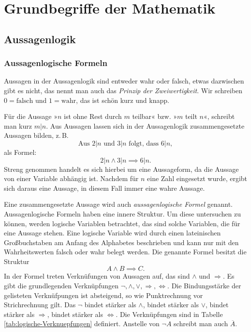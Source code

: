 
\chapter{Grundbegriffe der Mathematik}

\section{Aussagenlogik}

\subsection{Aussagenlogische Formeln}

Aussagen in der Aussagenlogik sind entweder wahr oder falsch,
etwas dazwischen gibt es nicht, das nennt man auch das \emph{Prinzip
der Zweiwertigkeit}.
Wir schreiben $0=\text{falsch}$ und $1=\text{wahr}$, das ist schön
kurz und knapp.

Für die Aussage »$n$ ist ohne Rest durch $m$ teilbar« bzw.
»$m$ teilt $n$«, schreibt man kurz $m|n$. Aus Aussagen lassen sich
in der Aussagenlogik zusammengesetzte Aussagen bilden, z.\,B.
\[\text{Aus $2|n$ und $3|n$ folgt, dass $6|n$},\]
als Formel:
\[2|n\land 3|n \implies 6|n.\]
Streng genommen handelt es sich hierbei um eine Aussageform, da die
Aussage von einer Variable abhängig ist. Nachdem für $n$ eine Zahl
eingesetzt wurde, ergibt sich daraus eine Aussage, in diesem Fall
immer eine wahre Aussage.

Eine zusammengesetzte Aussage wird auch \emph{aussagenlogische Formel}
genannt. Aussagenlogische Formeln haben eine innere Struktur. Um diese
untersuchen zu können, werden logische Variablen betrachtet,
das sind solche Variablen, die für eine Aussage stehen. Eine
logische Variable wird durch einen lateinischen Großbuchstaben
am Anfang des Alphabetes beschrieben und kann nur mit den
Wahrheitswerten falsch oder wahr belegt werden. Die genannte Formel
besitzt die Struktur
\[A\land B \implies C.\]
In der Formel treten Verknüfungen von Aussagen auf, das sind
$\land$ und $\Rightarrow$. Es gibt die grundlegenden Verknüpfungen
$\neg,\land,\lor,\Rightarrow,\Leftrightarrow$. Die Bindungsstärke
der gelisteten Verknüfpungen ist absteigend, so wie Punktrechnung
vor Strichrechnung gilt. Das $\neg$ bindet stärker als $\land$,
bindet stärker als $\lor$, bindet stärker als $\Rightarrow$,
bindet stärker als $\Leftrightarrow$. Die Verknüpfungen sind
in Tabelle \ref{tab:logische-Verknuepfungen} definiert.
Anstelle von $\neg A$ schreibt man auch $\overline A$.

